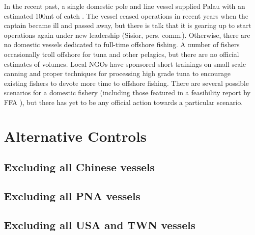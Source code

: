 \documentclass[9p,twocolumn,twoside,lineno]{pnas-new}
\begin{document}
In the recent past, a single domestic pole and line vessel supplied Palau with an estimated 100mt of catch \cite{Gillett2016}. The vessel ceased operations in recent years when the captain became ill and passed away, but there is talk that it is gearing up to start operations again under new leadership (Sisior, pers. comm.). Otherwise, there are no domestic vessels dedicated to full-time offshore fishing. A number of fishers occasionally troll offshore for tuna and other pelagics, but there are no official estimates of volumes. 
Local NGOs have sponsored short trainings on small-scale canning and proper techniques for processing high grade tuna to encourage existing fishers to devote more time to offshore fishing. There are several possible scenarios for a domestic fishery (including those featured in a feasibility report by FFA \citep{Skirtun2017}), but there has yet to be any official action towards a particular scenario. 

\clearpage

\section{Alternative Controls}
\subsection{Excluding all Chinese vessels}



\clearpage
\subsection{Excluding all PNA vessels}



\clearpage
\subsection{Excluding all USA and TWN vessels}


\end{document}
